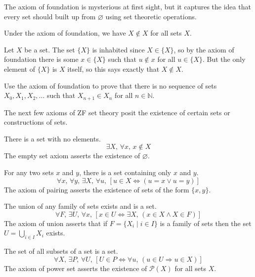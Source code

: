 The axiom of foundation is mysterious at first sight, but it captures the idea that every set should built up from $\varnothing$ using set theoretic operations.

\begin{lemma}
Under the axiom of foundation, we have $X \not \in X$ for all sets $X$.
\end{lemma}

\begin{cproof}
Let $X$ be a set. The set $\{ X \}$ is inhabited since $X \in \{ X \}$, so by the axiom of foundation there is some $x \in \{ X \}$ such that $u \not\in x$ for all $u \in \{ X \}$. But the only element of $\{ X \}$ is $X$ itself, so this says exactly that $X \not\in X$.
\end{cproof}

\begin{exercise}
\label{exStrictlyDecreasingSequenceOfSets}
Use the axiom of foundation to prove that there is no sequence of sets $X_0,X_1,X_2,\dots$ such that $X_{n+1} \in X_n$ for all $n \in \mathbb{N}$.
\end{exercise}

The next few axioms of ZF set theory posit the existence of certain sets or constructions of sets.

\begin{axiom}
\label{axZFCEmptySet}
There is a set with no elements.
\[ \exists X,\, \forall x,\, x \not \in X \]
The empty set axiom asserts the existence of $\varnothing$.
\end{axiom}

\begin{axiom}
\label{axZFCPairing}
For any two sets $x$ and $y$, there is a set containing only $x$ and $y$.
\[ \forall x,\, \forall y,\, \exists X,\, \forall u,\, [u \in X \Leftrightarrow (u=x \vee u=y)] \]
The axiom of pairing asserts the existence of sets of the form $\{ x, y \}$.
\end{axiom}

\begin{axiom}
\label{axZFCUnion}
The union of any family of sets exists and is a set.
\[ \forall F,\, \exists U,\, \forall x,\, [x \in U \Leftrightarrow \exists X,\, (x \in X \wedge X \in F)] \]
The axiom of union asserts that if $F = \{ X_i \mid i \in I \}$ is a family of sets then the set $U=\bigcup_{i \in I} X_i$ exists.
\end{axiom}

\begin{axiom}
\label{axZFCPowerSet}
The set of all subsets of a set is a set.
\[ \forall X,\, \exists P,\, \forall U,\, [U \in P \Leftrightarrow \forall u,\, (u \in U \Rightarrow u \in X)] \]
The axiom of power set asserts the existence of $\mathcal{P}(X)$ for all sets $X$.
\end{axiom}

